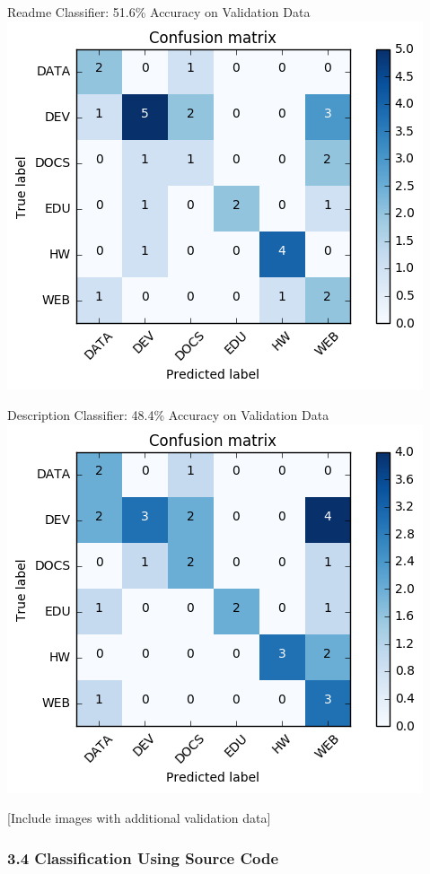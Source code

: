 \documentclass{article}
\begin{document}
Readme Classifier: 51.6\% Accuracy on Validation Data\\
\includegraphics{graphics/confusion-matrix-readme-classifier.png}

Description Classifier: 48.4\% Accuracy on Validation Data\\
\includegraphics{graphics/confusion-matrix-description-classifier.png}

{[}Include images with additional validation data{]}

\subsubsection{3.4 Classification Using Source
Code}\label{classification-using-source-code}
\end{document}
